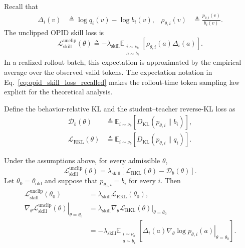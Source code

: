 Recall that
\begin{equation*}
\begin{aligned}
 \Delta_i(v)
 &\triangleq
 \log q_i(v)-\log b_i(v),
 &
 \rho_{\theta,i}(v)
 &\triangleq
 \frac{p_{\theta,i}(v)}{b_i(v)}.
\end{aligned}
\end{equation*}
The unclipped OPID skill loss is
\begin{equation}
 \mathcal L_{\mathrm{skill}}^{\mathrm{unclip}}(\theta)
 \triangleq
 -
 \lambda_{\mathrm{skill}}
 \mathbb E_{\substack{i\sim\nu_b\\a\sim b_i}}
 \left[
   \rho_{\theta,i}(a)\Delta_i(a)
 \right].
\label{eq:opid_skill_loss_recalled}
\end{equation}
In a realized rollout batch, this expectation is approximated by the
empirical average over the observed valid tokens. The expectation notation in
Eq.~\ref{eq:opid_skill_loss_recalled} makes the rollout-time token sampling
law explicit for the theoretical analysis.

Define the behavior-relative KL and the student--teacher reverse-KL loss as
\begin{equation*}
\begin{aligned}
 \mathcal D_b(\theta)
 &\triangleq
 \mathbb E_{i\sim\nu_b}
 \left[
   D_{\mathrm{KL}}
   \left(
     p_{\theta,i}\|b_i
   \right)
 \right],
 \\
 \mathcal L_{\mathrm{RKL}}(\theta)
 &\triangleq
 \mathbb E_{i\sim\nu_b}
 \left[
   D_{\mathrm{KL}}
   \left(
     p_{\theta,i}\|q_i
   \right)
 \right].
\end{aligned}
\end{equation*}


\begin{proposition}
\label{prop:relative_kl}
Under the assumptions above, for every admissible \(\theta\),
\begin{equation}
 \mathcal L_{\mathrm{skill}}^{\mathrm{unclip}}(\theta)
 =
 \lambda_{\mathrm{skill}}
 \left[
   \mathcal L_{\mathrm{RKL}}(\theta)
   -
   \mathcal D_b(\theta)
 \right].
\label{eq:relative_kl_decomposition}
\end{equation}
Let \(\theta_0=\theta_{\mathrm{old}}\) and suppose that
\(p_{\theta_0,i}=b_i\) for every \(i\). Then
\begin{align}
 \mathcal L_{\mathrm{skill}}^{\mathrm{unclip}}(\theta_0)
 &=
 \lambda_{\mathrm{skill}}
 \mathcal L_{\mathrm{RKL}}(\theta_0),
\label{eq:value_equivalence}
\\
 \left.
 \nabla_\theta
 \mathcal L_{\mathrm{skill}}^{\mathrm{unclip}}(\theta)
 \right|_{\theta=\theta_0}
 &=
 \lambda_{\mathrm{skill}}
 \left.
 \nabla_\theta
 \mathcal L_{\mathrm{RKL}}(\theta)
 \right|_{\theta=\theta_0}
\label{eq:gradient_equivalence}
\\
 &=
 -
 \lambda_{\mathrm{skill}}
 \mathbb E_{\substack{i\sim\nu_b\\a\sim b_i}}
 \left[
   \Delta_i(a)
   \left.
   \nabla_\theta
   \log p_{\theta,i}(a)
   \right|_{\theta=\theta_0}
 \right].
\label{eq:sampled_local_gradient}
\end{align}
\end{proposition}


